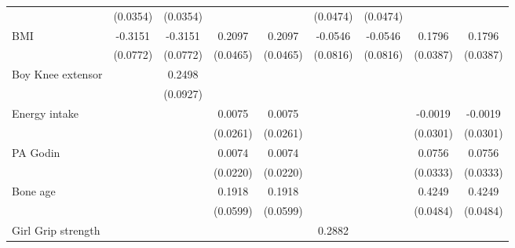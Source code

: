 \begin{table}[htbp]
\begin{tabular}{l*{8}{c}}
                         &  (0.0354)         &  (0.0354)         &                   &                   &  (0.0474)         &  (0.0474)         &                   &                   \\
[1em]
BMI                      &   -0.3151\sym{***}&   -0.3151\sym{***}&    0.2097\sym{***}&    0.2097\sym{***}&   -0.0546         &   -0.0546         &    0.1796\sym{***}&    0.1796\sym{***}\\
                         &  (0.0772)         &  (0.0772)         &  (0.0465)         &  (0.0465)         &  (0.0816)         &  (0.0816)         &  (0.0387)         &  (0.0387)         \\
[1em]
Boy Knee extensor        &                   &    0.2498\sym{***}&                   &                   &                   &                   &                   &                   \\
                         &                   &  (0.0927)         &                   &                   &                   &                   &                   &                   \\
[1em]
Energy intake            &                   &                   &    0.0075         &    0.0075         &                   &                   &   -0.0019         &   -0.0019         \\
                         &                   &                   &  (0.0261)         &  (0.0261)         &                   &                   &  (0.0301)         &  (0.0301)         \\
[1em]
PA Godin                 &                   &                   &    0.0074         &    0.0074         &                   &                   &    0.0756\sym{**} &    0.0756\sym{**} \\
                         &                   &                   &  (0.0220)         &  (0.0220)         &                   &                   &  (0.0333)         &  (0.0333)         \\
[1em]
Bone age                 &                   &                   &    0.1918\sym{***}&    0.1918\sym{***}&                   &                   &    0.4249\sym{***}&    0.4249\sym{***}\\
                         &                   &                   &  (0.0599)         &  (0.0599)         &                   &                   &  (0.0484)         &  (0.0484)         \\
[1em]
Girl Grip strength       &                   &                   &                   &                   &    0.2882\sym{***}&                   &                   &                   \\

\end{tabular}
\end{table}
